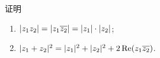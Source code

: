 \documentclass[xcolor={table}]{ctexbook}
\newcommand\enumnum[1]{{\mdseries\upshape{enumerate item}(#1)}}
\begin{document}
\begin{example}
	证明
	\begin{enumerate}
		\item $|z_1z_2|=|z_1\overline{z_2}|=|z_1|\cdot|z_2|$;
		\item $|z_1+z_2|^2=|z_1|^2+|z_2|^2+2\operatorname{Re}(z_1\overline{z_2})$.
	\end{enumerate}
\end{example}







\end{document}
